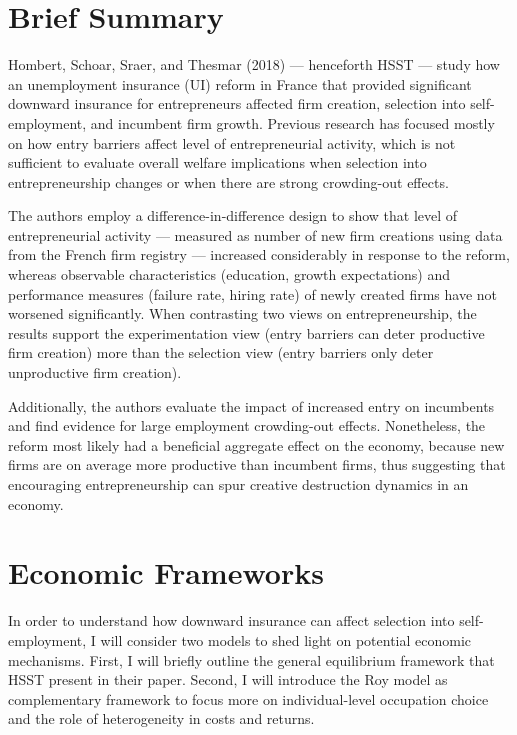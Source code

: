 \section{Brief Summary}

Hombert, Schoar, Sraer, and Thesmar (2018) --- henceforth HSST --- study how an unemployment insurance (UI) reform in France that provided significant downward insurance for entrepreneurs affected firm creation, selection into self-employment, and incumbent firm growth. Previous research has focused mostly on how entry barriers affect level of entrepreneurial activity, which is not sufficient to evaluate overall welfare implications when selection into entrepreneurship changes or when there are strong crowding-out effects. \newline

\noindent The authors employ a difference-in-difference design to show that level of entrepreneurial activity --- measured as number of new firm creations using data from the French firm registry --- increased considerably in response to the reform, whereas observable characteristics (education, growth expectations) and performance measures (failure rate, hiring rate) of newly created firms have not worsened significantly. When contrasting two views on entrepreneurship, the results support the experimentation view (entry barriers can deter productive firm creation) more than the selection view (entry barriers only deter unproductive firm creation).

Additionally, the authors evaluate the impact of increased entry on incumbents and find evidence for large employment crowding-out effects. Nonetheless, the reform most likely had a beneficial aggregate effect on the economy, because new firms are on average more productive than incumbent firms, thus suggesting that encouraging entrepreneurship can spur creative destruction dynamics in an economy.



\section{Economic Frameworks}

In order to understand how downward insurance can affect selection into self-employment, I will consider two models to shed light on potential economic mechanisms. First, I will briefly outline the general equilibrium framework that HSST present in their paper. Second, I will introduce the Roy model as complementary framework to focus more on individual-level occupation choice and the role of heterogeneity in costs and returns.

